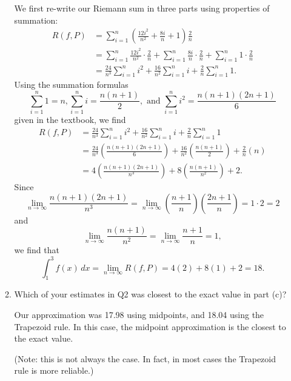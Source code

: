 \documentclass[letterpaper,12pt]{article}
\begin{document}
\begin{enumerate}
\begin{enumerate}
We first re-write our Riemann sum in three parts using properties of summation:
\begin{align*}
R(f,P) &= \sum_{i=1}^n \left(\frac{12i^2}{n^2}+\frac{8i}{n}+1\right)\frac{2}{n}\\
& = \sum_{i=1}^n \frac{12i^2}{n^2}\cdot \frac{2}{n} + \sum_{i=1}^n\frac{8i}{n}\cdot \frac{2}{n} + \sum_{i=1}^n 1\cdot \frac{2}{n}\\
& = \frac{24}{n^3}\sum_{i=1}^ni^2 + \frac{16}{n^2}\sum_{i=1}^ni+\frac{2}{n}\sum_{i=1}^n 1.
\end{align*}
Using the summation formulas
\[
\sum_{i=1}^n 1 = n, \sum_{i=1}^n i = \frac{n(n+1)}{2}, \text{ and } \sum_{i=1}^n i^2 = \frac{n(n+1)(2n+1)}{6}
\]
given in the textbook, we find
\begin{align*}
R(f,P) & = \frac{24}{n^3}\sum_{i=1}^ni^2 + \frac{16}{n^2}\sum_{i=1}^ni+\frac{2}{n}\sum_{i=1}^n 1\\
& = \frac{24}{n^3}\left(\frac{n(n+1)(2n+1)}{6}\right)+\frac{16}{n^2}\left(\frac{n(n+1)}{2}\right)+\frac{2}{n}(n)\\
& = 4\left(\frac{n(n+1)(2n+1)}{n^3}\right)+8\left(\frac{n(n+1)}{n^2}\right)+2.
\end{align*}
Since
\[
\lim_{n\to \infty}\frac{n(n+1)(2n+1)}{n^3}=\lim_{n\to\infty}\left(\frac{n+1}{n}\right)\left(\frac{2n+1}{n}\right) = 1\cdot 2 = 2
\]
and
\[
\lim_{n\to \infty}\frac{n(n+1)}{n^2} = \lim_{n\to\infty}\frac{n+1}{n} = 1,
\]
we find that
\[
\int_1^3 f(x)\,dx = \lim_{n\to\infty}R(f,P) = 4(2)+8(1)+2 = 18.
\]

\medskip

\item Which of your estimates in Q2 was closest to the exact value in part (c)?

\medskip

Our approximation was 17.98 using midpoints, and 18.04 using the Trapezoid rule. In this case, the midpoint approximation is the closest to the exact value.

(Note: this is not always the case. In fact, in most cases the Trapezoid rule is more reliable.)
\end{enumerate}




\end{enumerate}
\end{document}
